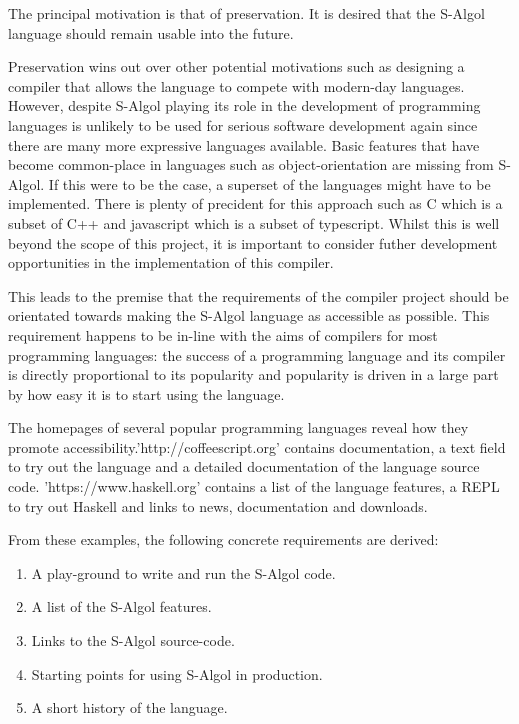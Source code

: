 \documentclass{article}
\begin{document}
The principal motivation is that of preservation. It is desired that the S-Algol language should remain usable into the future. 

Preservation wins out over other potential motivations such as designing a compiler that allows the language to compete with modern-day languages. However, despite S-Algol playing its role in the development of programming languages is unlikely to be used for serious software development again since there are many more expressive languages available. Basic features that have become common-place in languages such as object-orientation are missing from S-Algol. If this were to be the case, a superset of the languages might have to be implemented. There is plenty of precident for this approach such as C which is a subset of C++ and javascript which is a subset of typescript. Whilst this is well beyond the scope of this project, it is important to consider futher development opportunities in the implementation of this compiler.

This leads to the premise that the requirements of the compiler project should be orientated towards making the S-Algol language as accessible as possible. This requirement happens to be in-line with the aims of compilers for most programming languages: the success of a programming language and its compiler is directly proportional to its popularity and popularity is driven in a large part by how easy it is to start using the language.

The homepages of several popular programming languages reveal how they promote accessibility.'http://coffeescript.org' contains documentation, a text field to try out the language and a detailed documentation of the language source code. 'https://www.haskell.org' contains a list of the language features, a REPL to try out Haskell and links to news, documentation and downloads.

From these examples, the following concrete requirements are derived:

\begin{enumerate}
\item A play-ground to write and run the S-Algol code.
\item A list of the S-Algol features.
\item Links to the S-Algol source-code.
\item Starting points for using S-Algol in production.
\item A short history of the language.
\end{enumerate}
\end{document}
